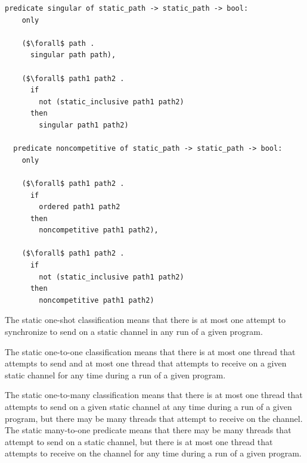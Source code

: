 \documentclass{article}
\begin{document}
\begin{lstlisting}[language=logic, mathescape]
  predicate singular of static_path -> static_path -> bool:
    only

    ($\forall$ path .
      singular path path),

    ($\forall$ path1 path2 .
      if
        not (static_inclusive path1 path2)
      then
        singular path1 path2)

  predicate noncompetitive of static_path -> static_path -> bool:
    only

    ($\forall$ path1 path2 .
      if
        ordered path1 path2
      then
        noncompetitive path1 path2),

    ($\forall$ path1 path2 .
      if
        not (static_inclusive path1 path2)
      then
        noncompetitive path1 path2)
\end{lstlisting}


The static one-shot classification means that there is at most one attempt
to synchronize to send on a static channel in any run of a given program.

The static one-to-one classification means that there is at most one thread that attempts to
send and at most one thread that attempts to receive on a given static channel for any time
during a run of a given program.

The static one-to-many classification means that there is at most one thread that attempts to
send on a given static channel at any time during a run of a given program, but there may be
many threads that attempt to receive on the channel. The static many-to-one predicate means
that there may be many threads that attempt to send on a static channel, but there is at most
one thread that attempts to receive on the channel for any time during a run of a given
program.
\end{document}
